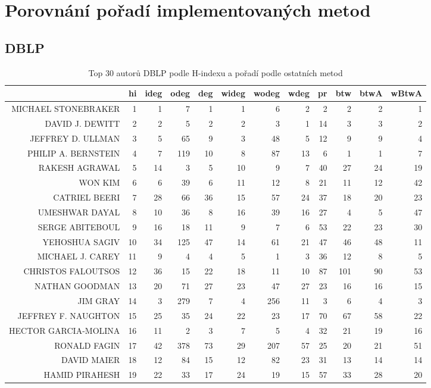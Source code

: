 \documentclass{bakalarka}
\begin{document}
\newpage
\chapter{Porovnání pořadí implementovaných metod}
\label{chapter:porovnani}
\section{DBLP}

\begin{table}[!ht]
\centering
\caption{Top 30 autorů DBLP podle H-indexu a pořadí podle ostatních metod}
\label{tab:ranks1}
\begin{sideways}
\begin{scriptsize}
\begin{tabular}{r|r|rrrrrrrrrr}
\toprule
&hi&ideg&odeg&deg&wideg&wodeg&wdeg&pr&btw&btwA&wBtwA\\
\midrule
MICHAEL STONEBRAKER&1&1&7&1&1&6&2&2&2&2&1\\
DAVID J. DEWITT&2&2&5&2&2&3&1&14&3&3&2\\
JEFFREY D. ULLMAN&3&5&65&9&3&48&5&12&9&9&4\\
PHILIP A. BERNSTEIN&4&7&119&10&8&87&13&6&1&1&7\\
RAKESH AGRAWAL&5&14&3&5&10&9&7&40&27&24&19\\
WON KIM&6&6&39&6&11&12&8&21&11&12&42\\
CATRIEL BEERI&7&28&66&36&15&57&24&37&18&20&23\\
UMESHWAR DAYAL&8&10&36&8&16&39&16&27&4&5&47\\
SERGE ABITEBOUL&9&16&18&11&9&7&6&53&22&23&30\\
YEHOSHUA SAGIV&10&34&125&47&14&61&21&47&46&48&11\\
MICHAEL J. CAREY&11&9&4&4&5&1&3&36&12&8&5\\
CHRISTOS FALOUTSOS&12&36&15&22&18&11&10&87&101&90&53\\
NATHAN GOODMAN&13&20&71&27&23&47&27&23&16&16&15\\
JIM GRAY&14&3&279&7&4&256&11&3&6&4&3\\
JEFFREY F. NAUGHTON&15&25&35&24&22&23&17&70&67&58&22\\
HECTOR GARCIA-MOLINA&16&11&2&3&7&5&4&32&21&19&16\\
RONALD FAGIN&17&42&378&73&29&207&57&25&20&21&51\\
DAVID MAIER&18&12&84&15&12&82&23&31&13&14&14\\
HAMID PIRAHESH&19&22&33&17&24&19&15&57&33&28&20\\

\end{tabular}
\end{scriptsize}
\end{sideways}
\end{table}
\end{document}
